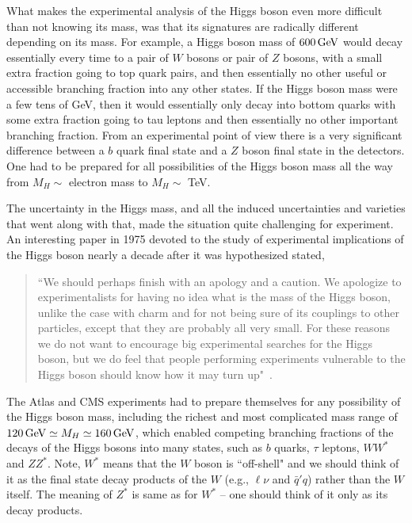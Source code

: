 \documentclass[letter,12pt]{article}
\def\gev{\, {\rm GeV}}
\begin{document}
What makes the experimental analysis of the Higgs boson even more difficult than not knowing its mass, was that its signatures are radically different depending on its mass. For example, a Higgs boson mass of $600\gev$ would decay essentially every time to a pair of $W$ bosons or pair of $Z$ bosons, with a small extra fraction going to top quark pairs, and then essentially no other useful or accessible branching fraction into any other states.  If the Higgs boson mass were a few tens of GeV, then it would essentially only decay into bottom quarks with some extra fraction going to tau leptons and then essentially no other important branching fraction. From an experimental point of view there is a very significant difference between a $b$ quark final state and a $Z$ boson final state in the detectors.  One had to be prepared for all possibilities of the Higgs boson mass all the way from $M_H\sim$ electron mass to $M_H\sim$ TeV. 

The uncertainty in the Higgs mass, and all the induced uncertainties and varieties that went along with that, made the situation quite challenging for experiment. An interesting paper in 1975 devoted to the study of experimental implications of the Higgs boson nearly a decade after it was hypothesized stated, 
\begin{quote}
``We should perhaps finish with an apology and a caution. We apologize to experimentalists for having no idea what is the mass of the Higgs boson, unlike the case with charm and for not being sure of its couplings to other particles, except that they are probably all very small. For these reasons we do not want to encourage big experimental searches for the Higgs boson, but we do feel that people performing experiments vulnerable to the Higgs boson should know how it may turn up"~\cite{Ellis:1975ap}.
\end{quote}

The Atlas and CMS experiments had to prepare themselves for any possibility of the Higgs boson mass, including the richest and most complicated mass range of $120\gev\simeq M_H\simeq 160\gev$, which enabled competing branching fractions of the decays of the Higgs bosons into many states, such as $b$ quarks, $\tau$ leptons, $WW^*$ and $ZZ^*$. Note, $W^*$ means that the $W$ boson is ``off-shell" and we should think of it as the final state decay products of the $W$ (e.g., $\ell\nu$ and $\bar q'q$) rather than the $W$ itself. The meaning of $Z^*$ is same as for $W^*$ -- one should think of it only as its decay products.
\end{document}

